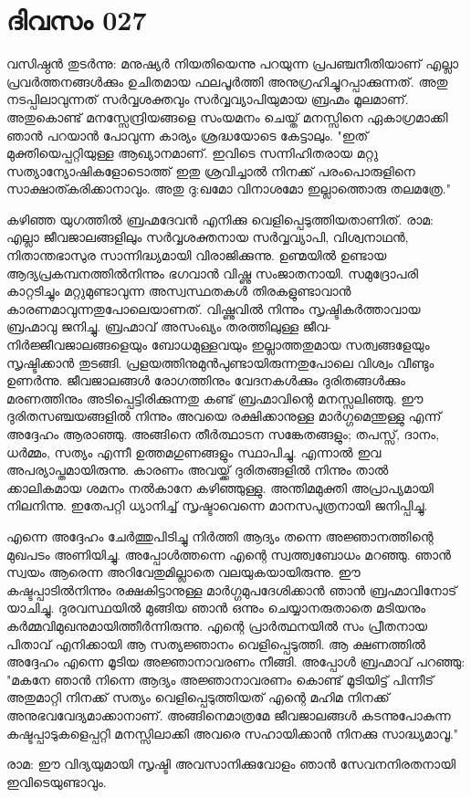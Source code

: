  
\section{ദിവസം 027}


വസിഷ്ഠന്‍ തുടര്‍ന്നു: മനുഷ്യര്‍ നിയതിയെന്നു പറയുന്ന പ്രപഞ്ചനീതിയാണ്‌ എല്ലാ പ്രവര്‍ത്തനങ്ങള്‍ക്കും ഉചിതമായ ഫലപൂര്‍ത്തി അനുഗ്രഹിച്ചുറപ്പാക്കുന്നത്‌. അതു നടപ്പിലാവുന്നത്‌ സര്‍വ്വശക്തവും സര്‍വ്വവ്യാപിയുമായ ബ്രഹ്മം മൂലമാണ്‌. അതുകൊണ്ട്‌ മനസ്സേന്ദ്രിയങ്ങളെ സംയമനം ചെയ്ത്‌ മനസ്സിനെ ഏകാഗ്രമാക്കി ഞാന്‍ പറയാന്‍ പോവുന്ന കാര്യം ശ്രദ്ധയോടെ കേട്ടാലും. "ഇത്‌ മുക്തിയെപ്പറ്റിയുള്ള ആഖ്യാനമാണ്‌. ഇവിടെ സന്നിഹിതരായ മറ്റു സത്യാന്യോഷികളോടൊത്ത്‌ ഇതു ശ്രവിച്ചാല്‍ നിനക്ക്‌ പരംപൊരുളിനെ സാക്ഷാത്കരിക്കാനാവും. അതു ദു:ഖമോ വിനാശമോ ഇല്ലാത്തൊരു തലമത്രേ." 

കഴിഞ്ഞ യുഗത്തില്‍ ബ്രഹ്മദേവന്‍ എനിക്കു വെളിപ്പെടുത്തിയതാണിത്‌. രാമ: എല്ലാ ജീവജാലങ്ങളിലും സര്‍വ്വശക്തനായ സര്‍വ്വവ്യാപി, വിശ്വനാഥന്‍, നിതാന്തഭാസുര സാന്നിദ്ധ്യമായി വിരാജിക്കുന്നു. ഉണ്മയില്‍ ഉണ്ടായ ആദ്യപ്രകമ്പനത്തില്‍നിന്നും ഭഗവാന്‍ വിഷ്ണു സംജാതനായി. സമുദ്രോപരി കാറ്റടിച്ചും മറ്റുമുണ്ടാവുന്ന അസ്വസ്ഥതകള്‍ തിരകളുണ്ടാവാന്‍ കാരണമാവുന്നതുപോലെയാണത്. വിഷ്ണുവില്‍ നിന്നും സൃഷ്ടികര്‍ത്താവായ ബ്രഹ്മാവു ജനിച്ചു. ബ്രഹ്മാവ്‌ അസംഖ്യം തരത്തിലുള്ള ജീവ-നിര്‍ജ്ജീവജാലങ്ങളെയും ബോധമുള്ളവയും ഇല്ലാത്തതുമായ സത്വങ്ങളേയും സൃഷ്ടിക്കാന്‍ തുടങ്ങി. പ്രളയത്തിനുമുന്‍പുണ്ടായിരുന്നതുപോലെ വിശ്വം വീണ്ടും ഉണര്‍ന്നു. ജീവജാലങ്ങള്‍ രോഗത്തിനും വേദനകള്‍ക്കും ദുരിതങ്ങള്‍ക്കും മരണത്തിനും അടിപ്പെട്ടിരിക്കുന്നതു കണ്ട്‌ ബ്രഹ്മാവിന്റെ മനസ്സലിഞ്ഞു. ഈ ദുരിതസഞ്ചയങ്ങളില്‍ നിന്നും അവയെ രക്ഷിക്കാനുള്ള മാര്‍ഗ്ഗമെന്തുള്ളു എന്ന് അദ്ദേഹം ആരാഞ്ഞു. അങ്ങിനെ തീര്‍ത്ഥാടന സങ്കേതങ്ങളും; തപസ്സ്‌, ദാനം, ധര്‍മ്മം, സത്യം എന്നീ ഉത്തമഗുണങ്ങളും സ്ഥാപിച്ചു. എന്നാല്‍ ഇവ അപര്യാപ്തമായിരുന്നു. കാരണം അവയ്ക്ക്‌ ദുരിതങ്ങളില്‍ നിന്നും താല്‍ ക്കാലികമായ ശമനം നല്‍കാനേ കഴിഞ്ഞുള്ളു. അന്തിമമുക്തി അപ്രാപ്യമായി നിലനിന്നു. ഇതേപറ്റി ധ്യാനിച്ച്‌ സൃഷ്ടാവെന്നെ മാനസപുത്രനായി ജനിപ്പിച്ചു.

എന്നെ അദ്ദേഹം ചേര്‍ത്തുപിടിച്ചു നിര്‍ത്തി ആദ്യം തന്നെ അജ്ഞാനത്തിന്റെ മുഖപടം അണിയിച്ചു. അപ്പോള്‍ത്തന്നെ എന്റെ സ്വത്ത്വബോധം മറഞ്ഞു.  ഞാന്‍ സ്വയം ആരെന്ന അറിവേതുമില്ലാതെ വലയുകയായിരുന്നു. ഈ കഷ്ടപ്പാടില്‍നിന്നും രക്ഷകിട്ടാനുള്ള മാര്‍ഗ്ഗമുപദേശിക്കാന്‍ ഞാന്‍ ബ്രഹ്മാവിനോട്‌ യാചിച്ചു.    ദുരവസ്ഥയില്‍ മുങ്ങിയ  ഞാന്‍   ഒന്നും ചെയ്യാനരുതാതെ മടിയനും കര്‍മ്മവിമുഖനുമായിത്തീര്‍ന്നിരുന്നു. എന്റെ പ്രാര്‍ത്ഥനയില്‍ സം പ്രീതനായ പിതാവ്‌ എനിക്കായി ആ സത്യജ്ഞാനം വെളിപ്പെടുത്തി. ആ ക്ഷണത്തില്‍ അദ്ദേഹം എന്നെ മൂടിയ അജ്ഞാനാവരണം നീങ്ങി. അപ്പോള്‍ ബ്രഹ്മാവ്‌ പറഞ്ഞു: "മകനേ ഞാന്‍ നിന്നെ ആദ്യം അജ്ഞാനാവരണം കൊണ്ട് മൂടിയിട്ട്‌ പിന്നീട്‌ അതുമാറ്റി നിനക്ക്‌ സത്യം വെളിപ്പെടുത്തിയത്‌ എന്റെ മഹിമ നിനക്ക്‌ അനുഭവവേദ്യമാക്കാനാണ്‌. അങ്ങിനെമാത്രമേ ജീവജാലങ്ങള്‍ കടന്നുപോകുന്ന കഷ്ടപ്പാടുകളെപ്പറ്റി മനസ്സിലാക്കി അവരെ സഹായിക്കാന്‍ നിനക്കു സാദ്ധ്യമാവൂ."

രാമ: ഈ വിദ്യയുമായി സൃഷ്ടി അവസാനിക്കുവോളം ഞാന്‍ സേവനനിരതനായി ഇവിടെയുണ്ടാവും. 
